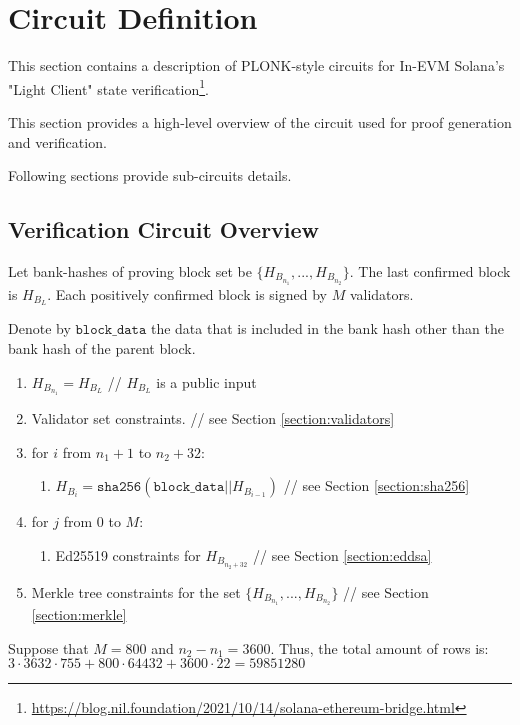 \section{Circuit Definition}
\label{section:circuit}
This section contains a description of PLONK-style circuits for In-EVM Solana's
"Light Client" state verification\footnote{\url{https://blog.nil.foundation/2021/10/14/solana-ethereum-bridge.html}}.

This section provides a high-level overview of the circuit used for proof generation
and verification.

Following sections provide sub-circuits details.

\subsection{Verification Circuit Overview}

Let bank-hashes of proving block set be $\{H_{B_{n_1}}, ..., H_{B_{n_2}}\}$.
The last confirmed block is $H_{B_{L}}$.
Each positively confirmed block is signed by $M$ validators.

Denote by $\texttt{block\_data}$ the data that is included in the bank hash other than the bank hash of the parent block.

\begin{enumerate}
    \item $H_{B_{n_1}} = H_{B_{L}}$ // $ H_{B_{L}}$ is a public input
    \item Validator set constraints. // see Section \ref{section:validators}
    \item for $i$ from $n_1 + 1$ to $n_2 + 32$:
    \begin{enumerate}
        \item $H_{B_i} = \texttt{sha256}(\texttt{block\_data} || H_{B_{i - 1}})$ // see Section \ref{section:sha256}
    \end{enumerate}
    \item for $j$ from $0$ to $M$:
    \begin{enumerate}
        \item Ed25519 constraints for $H_{B_{n_2 + 32}}$ // see Section \ref{section:eddsa}
    \end{enumerate}
    \item Merkle tree constraints for the set $\{H_{B_{n_1}}, ..., H_{B_{n_2}}\}$ // see Section \ref{section:merkle}
\end{enumerate}

Suppose that $M = 800$ and $n_2 - n_1 = 3600$.
Thus, the total amount of rows is: $3 \cdot 3632 \cdot 755 + 800 \cdot 64 432 + 3600 \cdot 22 = 59 851 280$